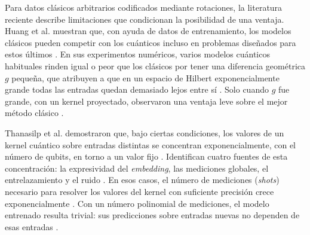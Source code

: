 Para datos clásicos arbitrarios codificados mediante rotaciones, la literatura reciente describe limitaciones que condicionan la posibilidad de una ventaja.
Huang et al. muestran que, con ayuda de datos de entrenamiento, los modelos clásicos pueden competir con los cuánticos incluso en problemas diseñados para estos últimos \cite{huang2021power}.
En sus experimentos numéricos, varios modelos cuánticos habituales rinden igual o peor que los clásicos por tener una diferencia geométrica $g$ pequeña, que atribuyen a que en un espacio de Hilbert exponencialmente grande todas las entradas quedan demasiado lejos entre sí \cite{huang2021power}.
Solo cuando $g$ fue grande, con un kernel proyectado, observaron una ventaja leve sobre el mejor método clásico \cite{huang2021power}.

Thanasilp et al. demostraron que, bajo ciertas condiciones, los valores de un kernel cuántico sobre entradas distintas se concentran exponencialmente, con el número de qubits, en torno a un valor fijo \cite{Thanasilp2024}.
Identifican cuatro fuentes de esta concentración: la expresividad del \textit{embedding}, las mediciones globales, el entrelazamiento y el ruido \cite{Thanasilp2024}.
En esos casos, el número de mediciones (\textit{shots}) necesario para resolver los valores del kernel con suficiente precisión crece exponencialmente \cite{Thanasilp2024}.
Con un número polinomial de mediciones, el modelo entrenado resulta trivial: sus predicciones sobre entradas nuevas no dependen de esas entradas \cite{Thanasilp2024}.

